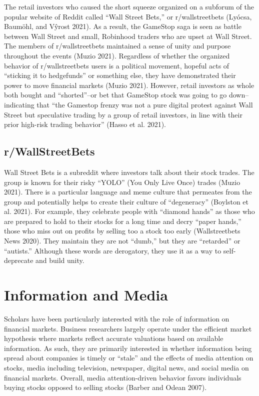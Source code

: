\documentclass[12pt,]{article}
\begin{document}
The retail investors who caused the short squeeze organized on a
subforum of the popular website of Reddit called ``Wall Street Bets,''
or r/wallstreetbets (Lyócsa, Baumöhl, and Vŷrost 2021). As a result, the
GameStop saga is seen as battle between Wall Street and small, Robinhood
traders who are upset at Wall Street. The members of r/wallstreetbets
maintained a sense of unity and purpose throughout the events (Muzio
2021). Regardless of whether the organized behavior of r/wallstreetbets
users is a political movement, hopeful acts of ``sticking it to
hedgefunds'' or something else, they have demonstrated their power to
move financial markets (Muzio 2021). However, retail investors as whole
both bought and ``shorted''--or bet that GameStop stock was going to go
down--indicating that ``the Gamestop frenzy was not a pure digital
protest against Wall Street but speculative trading by a group of retail
investors, in line with their prior high-risk trading behavior'' (Hasso
et al. 2021).

\hypertarget{rwallstreetbets}{%
\subsection{r/WallStreetBets}\label{rwallstreetbets}}

Wall Street Bets is a subreddit where investors talk about their stock
trades. The group is known for their risky ``YOLO'' (You Only Live Once)
trades (Muzio 2021). There is a particular language and meme culture
that permeates from the group and potentially helps to create their
culture of ``degeneracy'' (Boylston et al. 2021). For example, they
celebrate people with ``diamond hands'' as those who are prepared to
hold to their stocks for a long time and decry ``paper hands,'' those
who miss out on profits by selling too a stock too early (Wallstreetbets
News 2020). They maintain they are not ``dumb,'' but they are
``retarded'' or ``autists.'' Although these words are derogatory, they
use it as a way to self-deprecate and build unity.

\hypertarget{information-and-media}{%
\section{Information and Media}\label{information-and-media}}

Scholars have been particularly interested with the role of information
on financial markets. Business researchers largely operate under the
efficient market hypothesis where markets reflect accurate valuations
based on available information. As such, they are primarily interested
in whether information being spread about companies is timely or
``stale'' and the effects of media attention on stocks, media including
television, newspaper, digital news, and social media on financial
markets. Overall, media attention-driven behavior favors individuals
buying stocks opposed to selling stocks (Barber and Odean 2007).
\end{document}
